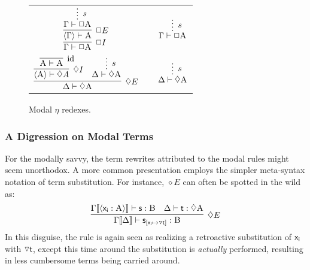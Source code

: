 \begin{figure}
	\centering
		\begin{tabularx}{0.8\textwidth}{@{}ccc@{}}
			$\infer[\Box I]{\Gamma \vdash \Box\prop{A}}{
			\infer[\Box E]{\bracket{\Gamma} \vdash \prop{A}}{
					\infer*[s]{\Gamma \vdash  \Box\prop{A}}{}
				}
			}
			$
			&
			\raisebox{5pt}{$\equiv$}
			&
			$\infer*[s]{\Gamma \vdash \Box\prop{A}}{}
			$\\[\smallsep]
			$\infer[\diamond E]{\Delta \vdash \diamond\prop{A}}{
				\infer[\diamond I]{\bracket{\prop{A}}\vdash \diamond A}{
					\infer[\Ax]{\prop{A} \vdash \prop{A}}{}
				}
				&
				\infer*[s]{\Delta \vdash \diamond\prop{A}}{}
			}$
			&
			\raisebox{15pt}{$\equiv$}
			&
			$\infer*[s]{\Delta \vdash \diamond \prop{A}}{}
			$
		\end{tabularx}
	\caption{Modal $\eta$ redexes.}
	\label{figure:modal_eta_reductions}
\end{figure}


\subsubsection{A Digression on Modal Terms}
For the modally savvy, the term rewrites attributed to the modal rules might seem unorthodox.
A more common presentation employs the simpler meta-syntax notation of term substitution.
For instance, $\diamond E$ can often be spotted in the wild as:
\[
	\infer[\diamond E]{\Gamma\ctx{\Delta} \vdash \term{s}_{[\term{x_i}\mapsto\term{\diaelim t}]}: \prop{B}}{
		\Gamma\ctx{\bracket{\term{x_i}:\prop{A}}}\vdash\term{s}:\prop{B}
		&
		\Delta \vdash \term{t}:\diamond\prop{A}
	}
\]
In this disguise, the rule is again seen as realizing a retroactive substitution of $\mathsf{x_i}$ with $\smallterm{\diaelim t}$, except this time around the substitution is \textit{actually} performed, resulting in less cumbersome terms being carried around.

